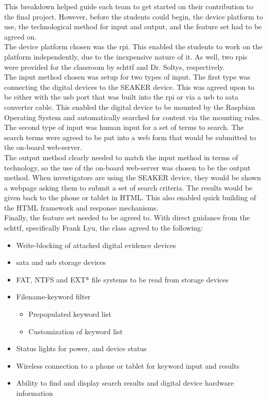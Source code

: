 \documentclass[12pt]{article}
\begin{document}
This breakdown helped guide each team to get started on their contribution to the
final project.  However, before the students could begin, the device platform to use,
the technological method for input and output, and the feature set had to be agreed on.\\

The device platform chosen was the \gls{rpi}.  This enabled the students to work on the platform
independently, due to the inexpensive nature of it.  As well, two \glspl{rpi} were provided
for the classroom by \gls{schttf} and Dr. Soltys, respectively.\\

The input method chosen was setup for two types of input.  The first type was connecting
the digital devices to the SEAKER device.  This was agreed upon to be either with the \gls{usb}
port that was built into the \gls{rpi} or via a \gls{usb} to \gls{sata} converter cable.  This enabled
the digital device to be mounted by the Raspbian Operating System and automatically 
searched for content via the mounting rules.  The second type of input was human input
for a set of terms to search.  The search terms were agreed to be put into a web form that
would be submitted to the on-board web-server.\\

The output method clearly needed to match the input method in terms of technology, so the
use of the on-board web-server was chosen to be the output method.  When investigators are
using the SEAKER device, they would be shown a webpage asking them to submit a 
set of search criteria.  The results would be given back to the phone or tablet in HTML.
This also enabled quick building of the HTML framework and response mechanisms.\\

Finally, the feature set needed to be agreed to.  With direct guidance from the \gls{schttf},
specifically Frank Lyu, the class agreed to the following:

\vspace{0.5 cm}
\begin{itemize}
  \item Write-blocking of attached digital evidence devices
  \item \gls{sata} and \gls{usb} storage devices
  \item FAT, NTFS and EXT* file systems to be read from storage devices
  \item Filename-keyword filter
  \begin{itemize}
    \item Prepopulated keyword list
    \item Customization of keyword list
  \end{itemize}
  \item Status lights for power, and device status
  \item Wireless connection to a phone or tablet for keyword input and results
  \item Ability to find and display search results and digital device hardware information
\end{itemize}
\vspace{0.5 cm}
\end{document}
